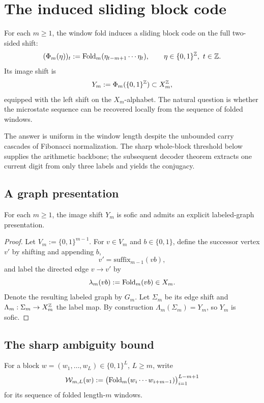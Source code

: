 \section{The induced sliding block code}
\label{sec:sequence}

For each $m\ge1$, the window fold induces a sliding block code on the full two-sided shift:
\begin{equation}\label{eq:Phi}
(\Phi_m(\eta))_t
:=
\mathrm{Fold}_m(\eta_{t-m+1}\cdots \eta_t),
\qquad \eta\in\{0,1\}^{\mathbb{Z}},\ t\in\mathbb{Z}.
\end{equation}
Its image shift is
\[
Y_m:=\Phi_m(\{0,1\}^{\mathbb{Z}})\subset X_m^{\mathbb{Z}},
\]
equipped with the left shift on the $X_m$-alphabet. The natural question is whether the microstate sequence can be recovered locally from the sequence of folded windows.

The answer is uniform in the window length despite the unbounded carry cascades of Fibonacci normalization. The sharp whole-block threshold below supplies the arithmetic backbone; the subsequent decoder theorem extracts one current digit from only three labels and yields the conjugacy.

\subsection{A graph presentation}

\begin{proposition}\label{prop:sofic}
For each $m\ge1$, the image shift $Y_m$ is sofic and admits an explicit labeled-graph presentation.
\end{proposition}

\begin{proof}
Let $V_m:=\{0,1\}^{m-1}$. For $v\in V_m$ and $b\in\{0,1\}$, define the successor vertex $v'$ by shifting and appending $b$,
\[
v'=\text{suffix}_{m-1}(vb),
\]
and label the directed edge $v\to v'$ by
\[
\lambda_m(vb):=\mathrm{Fold}_m(vb)\in X_m.
\]
Denote the resulting labeled graph by $G_m$. Let $\Sigma_m$ be its edge shift and $\Lambda_m:\Sigma_m\to X_m^{\mathbb{Z}}$ the label map. By construction $\Lambda_m(\Sigma_m)=Y_m$, so $Y_m$ is sofic.
\end{proof}

\subsection{The sharp ambiguity bound}

For a block $w=(w_1,\ldots,w_L)\in\{0,1\}^L$, $L\ge m$, write
\[
\mathcal{W}_{m,L}(w)
:=
\bigl(\mathrm{Fold}_m(w_i\cdots w_{i+m-1})\bigr)_{i=1}^{L-m+1}
\]
for its sequence of folded length-$m$ windows.

